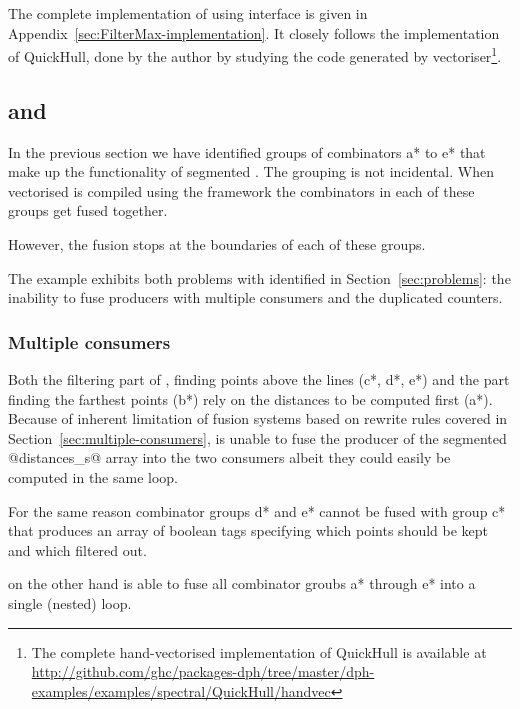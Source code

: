 \documentclass[preamble.tex]{subfiles}
\begin{document}
The complete implementation of  using \LiveFusion interface is given in Appendix~\ref{sec:FilterMax-implementation}. It closely follows the implementation of QuickHull, done by the author by studying the  code generated by \DPH vectoriser\footnote{The complete hand-vectorised implementation of QuickHull is available at \url{http://github.com/ghc/packages-dph/tree/master/dph-examples/examples/spectral/QuickHull/handvec}}.



\subsection{\StreamFusion and \FilterMax}

In the previous section we have identified groups of combinators \*a* to \*e* that make up the functionality of segmented \FilterMax. The grouping is not incidental. When vectorised \QuickHull is compiled using the \StreamFusion framework the combinators in each of these groups get fused together.

However, the fusion stops at the boundaries of each of these groups.

The \FilterMax example exhibits both problems with \StreamFusion identified in Section~\ref{sec:problems}: the inability to fuse producers with multiple consumers and the duplicated counters.


\subsubsection{Multiple consumers}

Both the filtering part of \FilterMax, finding points above the lines (\*c*, \*d*, \*e*) and the part finding the farthest points (\*b*) rely on the distances to be computed first (\*a*). Because of inherent limitation of fusion systems based on rewrite rules covered in Section~\ref{sec:multiple-consumers}, \StreamFusion is unable to fuse the producer of the segmented @distances_s@ array into the two consumers albeit they could easily be computed in the same loop.

For the same reason combinator groups \*d* and \*e* cannot be fused with group \*c* that produces an array of boolean tags specifying which points should be kept and which filtered out.

\LiveFusion on the other hand is able to fuse all combinator groubs \*a* through \*e* into a single (nested) loop.
\end{document}

